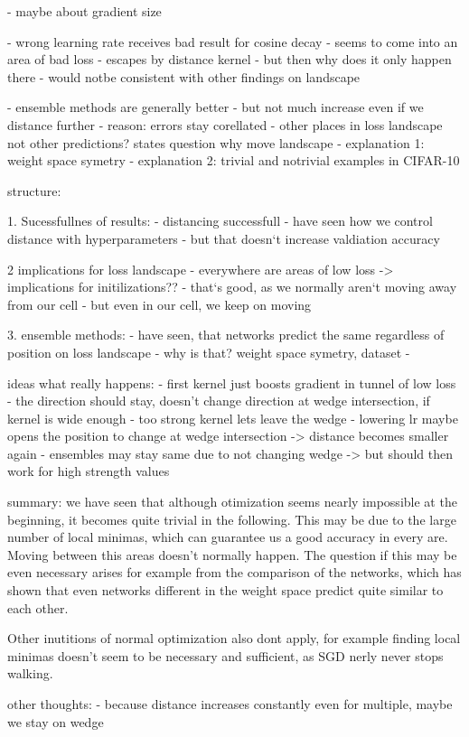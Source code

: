 -  maybe about gradient size
 

- wrong learning rate receives bad result for   cosine decay
- seems to come into an area of bad loss
-  escapes by  distance kernel
- but then why does it only happen there
- would notbe consistent with other findings on landscape



- ensemble methods are generally better
- but not much  increase even if we distance further
- reason: errors stay corellated
- other places in loss landscape not other predictions? states question why move landscape
- explanation 1: weight space symetry
- explanation 2: trivial and notrivial examples in CIFAR-10





















structure:

1. Sucessfullnes of results:
- distancing successfull
- have seen how we control distance with hyperparameters
- but that doesn`t increase valdiation accuracy

2 implications for loss landscape
- everywhere are areas of low loss -> implications for initilizations??
- that`s good, as we normally aren`t moving away from our cell
- but even in our cell, we keep on moving


3. ensemble methods:
- have seen, that networks predict the same regardless of position on loss landscape
- why is that? weight space symetry, dataset
- 


ideas what really happens:
- first kernel just boosts gradient in tunnel of low loss
- the direction should stay, doesn't change direction at wedge intersection, if kernel is wide enough
- too strong kernel lets leave the wedge
- lowering lr maybe opens the position to change at wedge intersection -> distance becomes smaller again
- ensembles may stay same due to not changing wedge -> but should then work for high strength values




summary: we have seen that although otimization seems nearly impossible at the
beginning, it becomes quite trivial in the following. This may be due to the
large number of local minimas, which can guarantee us a good accuracy in every
are. Moving between this areas doesn't normally happen. The question if this may
be even necessary arises for example from the comparison of the networks, which
has shown that even networks different in the weight space predict quite similar
to each other.

Other inutitions of normal optimization also dont apply, for
example finding local minimas doesn't seem to be necessary and sufficient, as
SGD nerly never stops walking.


other thoughts:
- because distance increases constantly even for multiple, maybe we stay on wedge